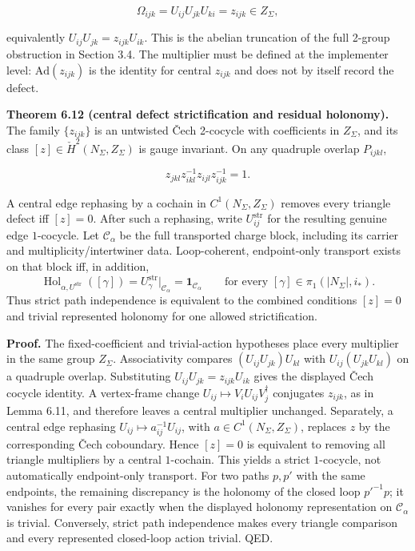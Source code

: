 \[
\Omega_{ijk}=U_{ij}U_{jk}U_{ki}=z_{ijk}
\in Z_\Sigma,
\]

equivalently \(U_{ij}U_{jk}=z_{ijk}U_{ik}\). This is the abelian truncation of the full
2-group obstruction in Section 3.4. The multiplier must be defined at the implementer level:
\(\mathrm{Ad}(z_{ijk})\) is the identity for central \(z_{ijk}\) and does not by itself record the
defect.

\textbf{Theorem 6.12 (central defect strictification and residual holonomy).} The family
\(\{z_{ijk}\}\) is an untwisted \v{C}ech 2-cocycle with coefficients in \(Z_\Sigma\), and its
class \([z]\in\check H^2(N_\Sigma,Z_\Sigma)\) is gauge invariant. On any quadruple overlap \(P_{ijkl}\),

\[
z_{jkl} z_{ikl}^{-1} z_{ijl} z_{ijk}^{-1} = 1.
\]

A central edge rephasing by a cochain in \(C^1(N_\Sigma,Z_\Sigma)\) removes every triangle defect
iff \([z]=0\). After such a rephasing,
write \(U^{\mathrm{str}}_{ij}\) for the resulting genuine edge \(1\)-cocycle. Let
\(\mathcal C_\alpha\) be the full transported charge block, including its carrier and
multiplicity/intertwiner data. Loop-coherent, endpoint-only transport exists on that block iff, in
addition,
\[
\operatorname{Hol}_{\alpha,U^{\mathrm{str}}}([\gamma])
=U^{\mathrm{str}}_\gamma\big|_{\mathcal C_\alpha}
=\mathbf 1_{\mathcal C_\alpha}
\qquad
\text{for every }[\gamma]\in\pi_1(|N_\Sigma|,i_*).
\]
Thus strict path independence is equivalent to the combined conditions \([z]=0\) and trivial represented holonomy for one allowed strictification.

\textbf{Proof.} The fixed-coefficient and trivial-action hypotheses place every multiplier in the
same group \(Z_\Sigma\). Associativity compares
\((U_{ij}U_{jk})U_{kl}\) with \(U_{ij}(U_{jk}U_{kl})\) on a quadruple overlap. Substituting
\(U_{ij}U_{jk}=z_{ijk}U_{ik}\) gives the displayed \v{C}ech cocycle identity. A vertex-frame
change \(U_{ij}\mapsto V_iU_{ij}V_j^\dagger\) conjugates \(z_{ijk}\), as in Lemma 6.11, and
therefore leaves a central multiplier unchanged. Separately, a central edge rephasing
\(U_{ij}\mapsto a_{ij}^{-1}U_{ij}\), with \(a\in C^1(N_\Sigma,Z_\Sigma)\), replaces \(z\) by the
corresponding \v{C}ech coboundary.
Hence \([z]=0\) is equivalent to removing all triangle multipliers by a central \(1\)-cochain.
This yields a strict \(1\)-cocycle, not automatically endpoint-only transport. For two paths
\(p,p'\) with the same endpoints, the remaining discrepancy is the holonomy of the closed loop
\(p'^{-1}p\); it vanishes for every pair exactly when the displayed holonomy representation on
\(\mathcal C_\alpha\) is trivial. Conversely, strict path independence makes every triangle
comparison and every represented closed-loop action trivial. QED.

